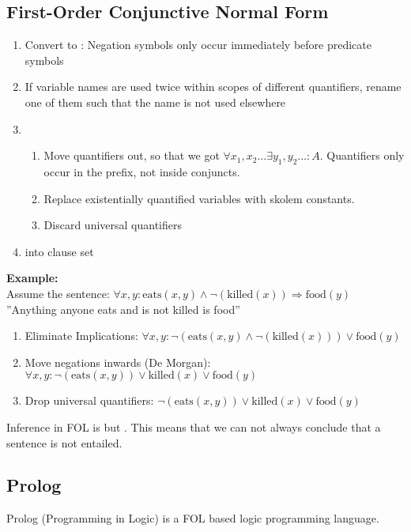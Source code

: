 \documentclass[
../../EiKI_Summary.tex,
]
{subfiles}
\begin{document}
\subsection{First-Order Conjunctive Normal Form}
\begin{enumerate}
    \item Convert to : Negation symbols only occur immediately before predicate symbols
    \item If variable names are used twice within scopes of different quantifiers, rename one of them such that the name is not used elsewhere
    \item {}
    \begin{enumerate}
        \item Move quantifiers out, so that we got $\forall x_1,x_2\dots \exists y_1,y_2\dots : A$. Quantifiers only occur in the prefix, not inside conjuncts.
        \item Replace existentially quantified variables with skolem constants.
        \item Discard universal quantifiers
    \end{enumerate}
    \item {} into clause set
\end{enumerate}

\textbf{Example:}\\
Assume the sentence: $\forall x,y: \text{eats}(x,y) \land \neg(\text{killed}(x)) \Rightarrow \text{food}(y)$ ''Anything anyone eats and is not killed is food''\\
\begin{enumerate}
    \item Eliminate Implications: $\forall x,y: \neg(\text{eats}(x,y) \land \neg(\text{killed}(x))) \lor \text{food}(y)$
    \item Move negations inwards (De Morgan): $\forall x,y: \neg(\text{eats}(x,y)) \lor \text{killed}(x) \lor \text{food}(y)$
    \item Drop universal quantifiers: $\neg(\text{eats}(x,y)) \lor \text{killed}(x) \lor \text{food}(y)$
\end{enumerate}

Inference in FOL is  but . This means that we can not always conclude that a sentence is not entailed.

\subsection{Prolog}
Prolog (Programming in Logic) is a FOL based logic programming language.
\end{document}
